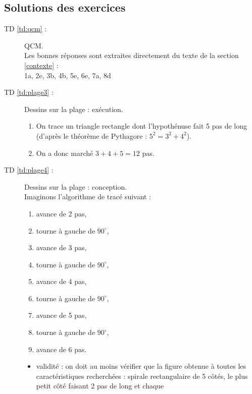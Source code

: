 \subsection{Solutions des exercices}\label{sub:solutions}
\begin{description}
\item[TD \ref{td:qcm} :] QCM.\\
	Les bonnes réponses sont extraites directement
	du texte de la section \ref{contexte} : \\
	1a, 2e, 3b, 4b, 5e, 6e, 7a, 8d
\item[TD \ref{td:plage3} :] Dessins sur la plage : exécution.
	\begin{enumerate}
	\item On trace un triangle rectangle dont l'hypothénuse fait 5 pas de long
		(d'après le théorème de Pythagore : $5^2 = 3^2 + 4^2$).
	\item On a donc marché $3 + 4 + 5 = 12$ pas.
	\end{enumerate}
\item[TD \ref{td:plage4} :] Dessins sur la plage : conception.\\
	Imaginons l'algorithme de tracé suivant :
	\begin{enumerate}
	\item avance de 2 pas,
	\item tourne à gauche de $90^\circ$,
	\item avance de 3 pas,
	\item tourne à gauche de $90^\circ$,
	\item avance de 4 pas,
	\item tourne à gauche de $90^\circ$,
	\item avance de 5 pas,
	\item tourne à gauche de $90^\circ$,
	\item avance de 6 pas.
	\end{enumerate}
	\begin{itemize}
	\item validité : on doit au moins vérifier que la figure obtenue à toutes
		les caractéristiques recherchées : spirale rectangulaire de
		5 côtés, le plus petit côté faisant 2 pas de long et chaque 

\end{itemize}
\end{description}
